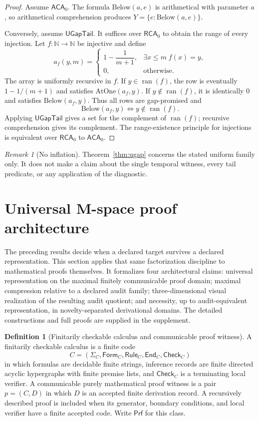\documentclass[11pt]{article}
\newcommand{\RCA}{\ensuremath{\mathsf{RCA}_0}}
\newcommand{\ACA}{\ensuremath{\mathsf{ACA}_0}}
\newcommand{\UGapTail}{\ensuremath{\mathsf{UGapTail}}}
\newcommand{\ran}{\ensuremath{\operatorname{ran}}}
\newcommand{\Proofs}{\ensuremath{\mathsf{Prf}}}
\theoremstyle{plain}
\theoremstyle{definition}
\newtheorem{definition}[theorem]{Definition}
\theoremstyle{remark}
\newtheorem{remark}[theorem]{Remark}
\begin{document}
\begin{proof}
Assume $\ACA$.  The formula $\mathrm{Below}(a,e)$ is arithmetical with
parameter $a$, so arithmetical comprehension produces
$Y=\{e:\mathrm{Below}(a,e)\}$.

Conversely, assume $\UGapTail$.  It suffices over $\RCA$ to obtain the range
of every injection.  Let $f:\mathbb N\to\mathbb N$ be injective and define
\[
a_f(y,m)=
\begin{cases}
1-\dfrac{1}{m+1},&\exists x\leq m\;f(x)=y,\\[1ex]
0,&\text{otherwise.}
\end{cases}
\]
The array is uniformly recursive in $f$.  If $y\in\ran(f)$, the row is
eventually $1-1/(m+1)$ and satisfies $\mathrm{AtOne}(a_f,y)$.  If
$y\notin\ran(f)$, it is identically $0$ and satisfies
$\mathrm{Below}(a_f,y)$.  Thus all rows are gap-promised and
\[
\mathrm{Below}(a_f,y)\Longleftrightarrow y\notin\ran(f).
\]
Applying $\UGapTail$ gives a set for the complement of $\ran(f)$; recursive
comprehension gives its complement.  The range-existence principle for
injections is equivalent over $\RCA$ to $\ACA$.
\end{proof}

\begin{remark}[No inflation]
Theorem~\ref{thm:ugap} concerns the stated uniform family only.  It does not
make a claim about the single temporal witness, every tail predicate, or any
application of the diagnostic.
\end{remark}


\section{Universal M-space proof architecture}
\label{sec:universal-mspace}

The preceding results decide when a declared target survives a declared
representation.  This section applies that same factorization discipline to
mathematical proofs themselves.  It formalizes four architectural claims:
universal representation on the maximal finitely communicable proof domain;
maximal compression relative to a declared audit family; three-dimensional
visual realization of the resulting audit quotient; and necessity, up to
audit-equivalent representation, in novelty-separated derivational domains.
The detailed constructions and full proofs are supplied in the supplement.

\begin{definition}[Finitarily checkable calculus and communicable proof witness]
\label{def:communicable-v9}
A finitarily checkable calculus is a finite code
\[
C=(\Sigma_C,\mathsf{Form}_C,\mathsf{Rule}_C,\mathsf{End}_C,\mathsf{Check}_C)
\]
in which formulas are decidable finite strings, inference records are finite
directed acyclic hypergraphs with finite premise lists, and
$\mathsf{Check}_C$ is a terminating local verifier.  A communicable purely
mathematical proof witness is a pair $p=(C,D)$ in which $D$ is an accepted
finite derivation record.  A recursively described proof is included when its
generator, boundary conditions, and local verifier have a finite accepted code.
Write $\Proofs$ for this class.
\end{definition}
\end{document}
